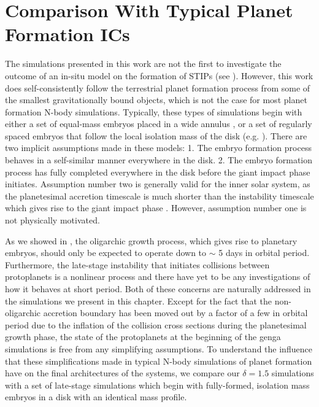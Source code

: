 \section{Comparison With Typical Planet Formation ICs} \label{sec:typicalICs}

The simulations presented in this work are not the first to investigate the outcome of an in-situ model on the formation of STIPs (see \cite{hansen12}). However, this work does self-consistently follow the terrestrial planet formation process from some of the smallest gravitationally bound objects, which is not the case for most planet formation N-body simulations. Typically, these types of simulations begin with either a set of equal-mass embryos placed in a wide annulus \cite{obrien06}, or a set of regularly spaced embryos that follow the local isolation mass of the disk (e.g. \cite{raymond05, raymond06, hansen12}). There are two implicit assumptions made in these models: 1. The embryo formation process behaves in a self-similar manner everywhere in the disk. 2. The embryo formation process has fully completed everywhere in the disk before the giant impact phase initiates. Assumption number two is generally valid for the inner solar system, as the planetesimal accretion timescale is much shorter than the instability timescale which gives rise to the giant impact phase \cite{chambers96}. However, assumption number one is not physically motivated.

As we showed in \cite{wallace23}, the oligarchic growth process, which gives rise to planetary embryos, should only be expected to operate down to $\sim$ 5 days in orbital period. Furthermore, the late-stage instability that initiates collisions between protoplanets is a nonlinear process and there have yet to be any investigations of how it behaves at short period. Both of these concerns are naturally addressed in the simulations we present in this chapter. Except for the fact that the non-oligarchic accretion boundary has been moved out by a factor of a few in orbital period due to the inflation of the collision cross sections during the planetesimal growth phase, the state of the protoplanets at the beginning of the {\sc genga} simulations is free from any simplifying assumptions. To understand the influence that these simplifications made in typical N-body simulations of planet formation have on the final architectures of the systems, we compare our $\delta = 1.5$ simulations with a set of late-stage simulations which begin with fully-formed, isolation mass embryos in a disk with an identical mass profile.

